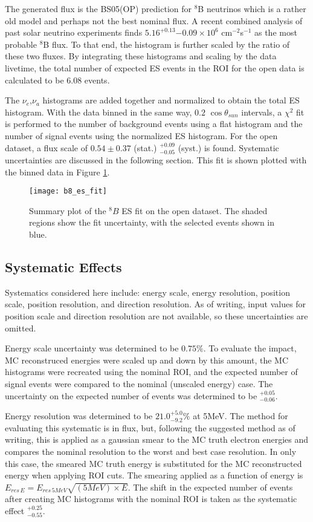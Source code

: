 The generated flux is the BS05(OP) prediction for $^8$B neutrinos which is a
rather old model and perhaps not the best nominal flux. 
A recent combined analysis of past solar neutrino experiments finds 
$5.16^{+0.13}{-0.09}\times10^6$ cm$^{-2}$s$^{-1}$ \cite{GlobalSolarFlux} as the 
most probable $^8$B flux.
To that end, the histogram is further scaled by the ratio of these two fluxes.
By integrating these histograms and scaling by the data livetime, the total
number of expected ES events in the ROI for the open data is calculated to be
$6.08$ events.

The $\nu_e$,$\nu_a$ histograms are added together and normalized to obtain the
total ES histogram.
With the data binned in the same way, $0.2$ $\cos{\theta_{sun}}$ intervals, a
$\chi^2$ fit is performed to the number of background events using a flat
histogram and the number of signal events using the normalized ES histogram.
For the open dataset, a flux scale of $0.54\pm0.37$ (stat.) $^{+0.09}_{-0.05}$ 
(syst.) is found.
Systematic uncertainties are discussed in the following section.
This fit is shown plotted with the binned data in Figure \ref{fig:solar:openfit}.

\begin{figure}
\centering
\texttt{[image: b8\_es\_fit]}
\caption{Summary plot of the $^8B$ ES fit on the open dataset.
         The shaded regions show the fit uncertainty, with the selected events
         shown in blue.}
\label{fig:solar:openfit}
\end{figure}

\subsection{Systematic Effects}
Systematics considered here include: energy scale, energy resolution, position 
scale, position resolution, and direction resolution. 
As of writing, input values for position scale and direction resolution are not
available, so these uncertainties are omitted.

Energy scale uncertainty was determined to be $0.75\%$. To evaluate the impact,
MC reconstruced energies were scaled up and down by this amount, the MC histograms 
were recreated using the nominal ROI, and the expected number of signal events 
were compared to the nominal (unscaled energy) case. The uncertainty on the 
expected number of events was determined to be $^{+0.05}_{-0.06}$.

Energy resolution was determined to be $21.0^{+5.0}_{-9.2}\%$ at 5MeV. The method for 
evaluating this systematic is in flux, but, following the suggested method as 
of writing, this is applied as a gaussian smear to the MC truth electron energies
and compares the nominal resolution to the worst and best case resolution. In 
only this case, the smeared MC truth energy is substituted for the MC reconstructed
energy when applying ROI cuts. The smearing applied as a function of energy is
$E_{res\,E} = E_{res\,5MeV} \sqrt{(5 MeV) \times E}$. The shift in the expected 
number of events after creating MC histograms with the nominal ROI is taken as 
the systematic effect $^{+0.25}_{-0.55}$.

